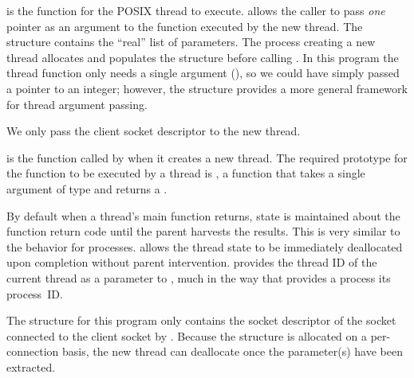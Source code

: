 \begin{topcode}



 is the function for the POSIX thread to execute.
 allows the caller to pass
\emph{one} pointer as an
argument to the function executed by the new thread.  The 
structure contains the ``real'' list of parameters.  The process
creating a new thread allocates
and populates the structure before calling
.
In this program the thread function only needs a single argument
(), so we could have simply passed a pointer to an integer;
however, the  structure provides a more general framework
for thread argument passing.


We only pass the client socket descriptor to the new thread.




 is the function called by
 when
it creates a new thread.  The required prototype for the function to
be executed by a thread is , a function that takes a single argument of type  and
returns a .

\begin{bottomcode}


By default when a thread's main function returns, state is maintained
about the function return code until the parent harvests the results.
This is very similar to the behavior for processes.
 allows the thread state
to be immediately deallocated upon completion without parent intervention.
 provides the thread ID of the
current thread as a parameter to , much in
the way that  provides a process its process~ID.



The  structure for this program only contains the socket
descriptor of the socket connected to the client socket by
.  Because the  structure is
allocated on a
per-connection basis, the new thread can deallocate  once the
parameter(s) have been extracted.



\end{bottomcode}
\end{topcode}
